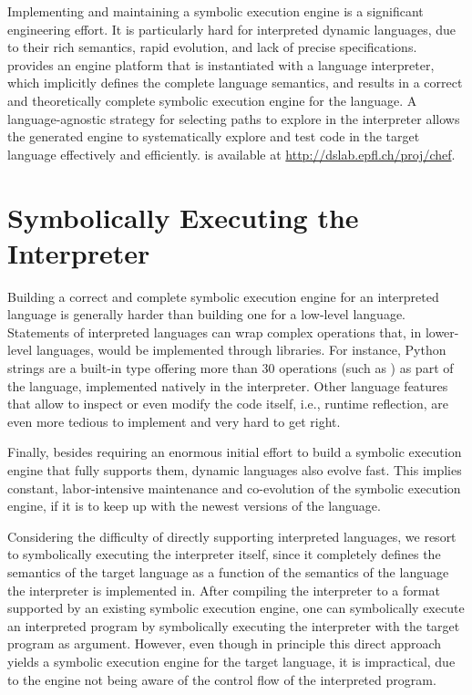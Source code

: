 Implementing and maintaining a symbolic execution engine is a significant engineering effort. It is particularly hard for interpreted dynamic languages, due to their rich semantics, rapid evolution, and lack of precise specifications.
%
\chef provides an engine platform that is instantiated with a language interpreter, which implicitly defines the complete language semantics, and results in a correct and theoretically complete symbolic execution engine for the language.
%
A language-agnostic strategy for selecting paths to explore in the interpreter allows the generated engine to systematically explore and test code in the target language effectively and efficiently.
%
\chef is available at {\url{http://dslab.epfl.ch/proj/chef}}.



\iffalse
\section{Symbolically Executing the Interpreter}

Building a correct and complete symbolic execution engine for an interpreted language is generally harder than building one for a low-level language. 
%
Statements of interpreted languages can wrap complex operations that, in lower-level languages, would be implemented through libraries. For instance, Python strings are a built-in type offering more than 30 operations (such as ) as part of the language, implemented natively in the interpreter. 
%
Other language features that allow to inspect or even modify the code itself, i.e., runtime reflection, are even more tedious to implement and very hard to get right.

Finally, besides requiring an enormous initial effort to build a symbolic execution engine that fully supports them, dynamic languages also evolve fast. This implies constant, labor-intensive maintenance and co-evolution of the symbolic execution engine, if it is to keep up with the newest versions of the language.

Considering the difficulty of directly supporting interpreted languages, we resort to symbolically executing the interpreter itself, since it completely defines the semantics of the target language as a function of the semantics of the language the interpreter is implemented in.
%
After compiling the interpreter to a format supported by an existing symbolic execution engine, one can symbolically execute an interpreted program by symbolically executing the interpreter with the target program as argument.
%
However, even though in principle this direct approach yields a symbolic execution engine for the target language, it is impractical, due to the engine not being aware of the control flow of the interpreted program.

